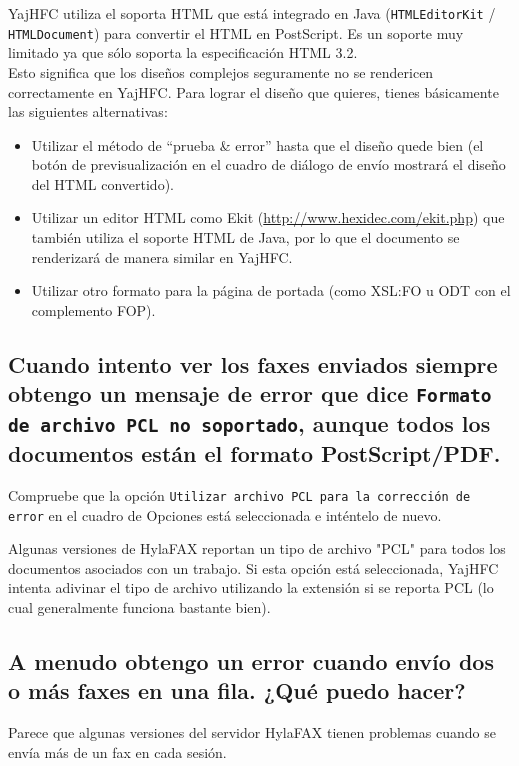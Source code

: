 \documentclass[a4paper,10pt]{scrartcl}
\begin{document}
YajHFC utiliza el soporta HTML que está integrado en Java (\texttt{HTMLEditorKit} / \texttt{HTMLDocument}) para convertir el HTML en PostScript. Es un soporte muy limitado ya que sólo soporta la especificación HTML 3.2.\\
Esto significa que los diseños complejos seguramente no se rendericen correctamente en YajHFC.
Para lograr el diseño que quieres, tienes básicamente las siguientes alternativas:

\begin{itemize}
 \item Utilizar el método de ``prueba \& error'' hasta que el diseño quede bien (el botón de previsualización en el cuadro de diálogo de envío mostrará el diseño del HTML convertido).
 \item Utilizar un editor HTML como Ekit (\url{http://www.hexidec.com/ekit.php}) que también utiliza el soporte HTML de Java, por lo que el documento se renderizará de manera similar en YajHFC.
 \item Utilizar otro formato para la página de portada (como XSL:FO u ODT con el complemento FOP).
\end{itemize}

\subsection{Cuando intento ver los faxes enviados siempre obtengo un mensaje de error 
   que dice \texttt{Formato de archivo PCL no soportado}, aunque todos los documentos 
   están el formato PostScript/PDF.}

Compruebe que la opción \texttt{Utilizar archivo PCL para la corrección de error} en el 
cuadro de Opciones está seleccionada e inténtelo de nuevo.
 
Algunas versiones de HylaFAX reportan 
un tipo de archivo "PCL" para todos los documentos asociados con un trabajo. 
Si esta opción está seleccionada, YajHFC intenta adivinar el tipo de archivo 
utilizando la extensión si se reporta PCL (lo cual generalmente funciona bastante bien).

\subsection{A menudo obtengo un error cuando envío dos o más faxes en una fila. ¿Qué puedo hacer?}

Parece que algunas versiones del servidor HylaFAX tienen problemas cuando se envía más de un fax en cada sesión.
\end{document}
